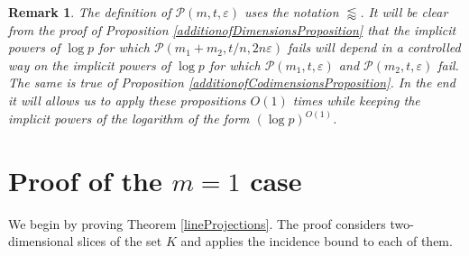 \documentclass{amsart}
\newtheorem{remark}[theorem]{Remark}
\begin{document}
\begin{remark}
    The definition of $\mathcal{P}(m, t, \varepsilon)$ uses the notation $\lessapprox$. It will be clear from the proof of Proposition \ref{additionofDimensionsProposition} that the implicit powers of $\log p$ for which $\mathcal{P}(m_1 + m_2, t/n, 2n\varepsilon)$ fails will depend in a controlled way on the implicit powers of $\log p$ for which $\mathcal{P}(m_1, t, \varepsilon)$ and $\mathcal{P}(m_2, t, \varepsilon)$ fail. The same is true of Proposition \ref{additionofCodimensionsProposition}. In the end it will allows us to apply these propositions $O(1)$ times while keeping the implicit powers of the logarithm of the form $(\log p)^{O(1)}$.
\end{remark}

\section{Proof of the \texorpdfstring{$m = 1$}{m = 1} case}
We begin by proving Theorem \ref{lineProjections}. The proof considers two-dimensional slices of the set $K$ and applies the incidence bound to each of them.
\end{document}
